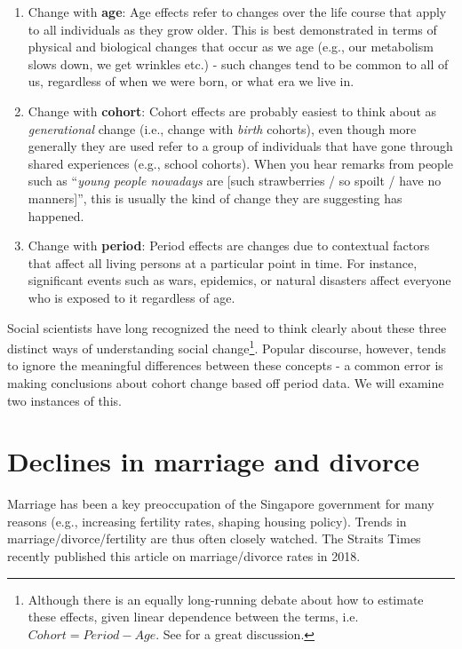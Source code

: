 \documentclass[openany]{book}
\let\rmarkdownfootnote\footnote%
\def\footnote{\protect\rmarkdownfootnote}
\begin{document}
\begin{enumerate}
\def\labelenumi{\arabic{enumi}.}
\item
  Change with \textbf{age}: Age effects refer to changes over the life
  course that apply to all individuals as they grow older. This is best
  demonstrated in terms of physical and biological changes that occur as
  we age (e.g., our metabolism slows down, we get wrinkles etc.) - such
  changes tend to be common to all of us, regardless of when we were
  born, or what era we live in.
\item
  Change with \textbf{cohort}: Cohort effects are probably easiest to
  think about as \emph{generational} change (i.e., change with
  \emph{birth} cohorts), even though more generally they are used refer
  to a group of individuals that have gone through shared experiences
  (e.g., school cohorts). When you hear remarks from people such as
  ``\emph{young people nowadays} are {[}such strawberries / so spoilt /
  have no manners{]}'', this is usually the kind of change they are
  suggesting has happened.
\item
  Change with \textbf{period}: Period effects are changes due to
  contextual factors that affect all living persons at a particular
  point in time. For instance, significant events such as wars,
  epidemics, or natural disasters affect everyone who is exposed to it
  regardless of age.
\end{enumerate}

Social scientists have long recognized the need to think clearly about
these three distinct ways of understanding social change\footnote{Although
  there is an equally long-running debate about how to estimate these
  effects, given linear dependence between the terms, i.e.
  \(Cohort = Period - Age\). See \citet{fosse_analyzing_2019} for a
  great discussion.}. Popular discourse, however, tends to ignore the
meaningful differences between these concepts - a common error is making
conclusions about cohort change based off period data. We will examine
two instances of this.

\section{Declines in marriage and divorce}\label{marriage-decline}

Marriage has been a key preoccupation of the Singapore government for
many reasons (e.g., increasing fertility rates, shaping housing policy).
Trends in marriage/divorce/fertility are thus often closely watched. The
Straits Times recently published this article on marriage/divorce rates
in 2018.
\end{document}
